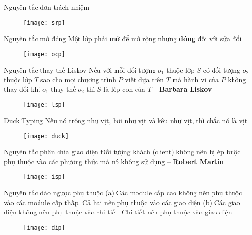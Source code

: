 \documentclass{beamer}
\begin{document}
\begin{frame}{Nguyên tắc đơn trách nhiệm}
    \begin{figure}
        \centering
        \texttt{[image: srp]}
    \end{figure}
\end{frame}

\begin{frame}{Nguyên tắc mở đóng}
    \Large Một lớp phải \textbf{\color{red}mở} để mở rộng
    nhưng \textbf{\color{red}đóng} đối với sửa đổi
    \vspace{-0.5cm}
    \begin{figure}
        \centering
        \texttt{[image: ocp]}
    \end{figure}
\end{frame}

\begin{frame}{Nguyên tắc thay thế Liskov}
    Nếu với mỗi đối tượng $o_1$ thuộc lớp $S$ 
    có đối tượng $o_2$ thuộc lớp $T$ sao cho mọi chương trình
    $P$ viết dựa trên $T$ mà hành vi của $P$ không thay đổi
    khi $o_1$ thay thế $o_2$ thì $S$ là lớp con của $T$
    -- \textbf{Barbara Liskov}
    \begin{figure}
        \centering
        \texttt{[image: lsp]}
    \end{figure}
\end{frame}

\begin{frame}{Duck Typing}
    \Large Nếu nó trông như vịt, bơi như vịt và 
    kêu như vịt, thì chắc nó là vịt
    \begin{figure}
        \centering
        \texttt{[image: duck]}
    \end{figure}
\end{frame}

\begin{frame}{Nguyên tắc phân chia giao diện}
    \Large Đối tượng khách (client) không nên bị ép buộc
    phụ thuộc vào các phương thức mà nó không sử dụng
    -- \textbf{Robert Martin}
    \begin{figure}
        \centering
        \texttt{[image: isp]}
    \end{figure}
\end{frame}

\begin{frame}{Nguyên tắc đảo ngược phụ thuộc}
    (a) Các module cấp cao không nên phụ thuộc vào
    các module cấp thấp. Cả hai nên phụ thuộc vào các giao diện
    (b) Các giao diện không nên phụ thuộc vào chi tiết.
    Chi tiết nên phụ thuộc vào giao diện
    \begin{figure}
        \centering
        \texttt{[image: dip]}
    \end{figure}
\end{frame}
\end{document}
